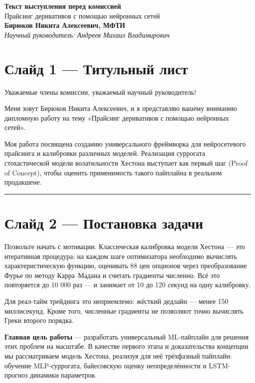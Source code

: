 \documentclass[12pt,a4paper]{article}
\begin{document}
\begin{center}
    \LARGE\textbf{Текст выступления перед комиссией}\\[1em]
    \Large Прайсинг деривативов с помощью нейронных сетей\\[1em]
    \large \textbf{Бирюков Никита Алексеевич, МФТИ}\\
    \textit{Научный руководитель: Андреев Михаил Владимирович}
\end{center}

\vspace{1.5em}

\section*{Слайд 1 — Титульный лист}

Уважаемые члены комиссии, уважаемый научный руководитель!

Меня зовут Бирюков Никита Алексеевич, и я представляю вашему вниманию дипломную работу на тему «Прайсинг деривативов с помощью нейронных сетей».

Моя работа посвящена созданию универсального фреймворка для нейросетевого прайсинга и калибровки различных моделей. Реализация суррогата стохастической модели волатильности Хестона выступает как первый шаг (Proof of Concept), чтобы оценить применимость такого пайплайна в реальном продакшене.

\vspace{1em}\hrule\vspace{1em}

\section*{Слайд 2 — Постановка задачи}

Позвольте начать с мотивации. Классическая калибровка модели Хестона — это итеративная процедура: на каждом шаге оптимизатора необходимо вычислять характеристическую функцию, оценивать 88 цен опционов через преобразование Фурье по методу Карра–Мадана и считать градиенты численно. Всё это повторяется до 10 000 раз — и занимает от 10 до 120 секунд на одну калибровку.

Для реал-тайм трейдинга это неприемлемо: жёсткий дедлайн — менее 150 миллисекунд. Кроме того, численные градиенты не позволяют точно вычислять Греки второго порядка.

\textbf{Главная цель работы} — разработать универсальный ML-пайплайн для решения этих проблем на масштабе. В качестве первого этапа и доказательства концепции мы рассматриваем модель Хестона, реализуя для неё трёхфазный пайплайн: обучение MLP-суррогата, байесовскую оценку неопределённости и LSTM-прогноз динамики параметров.
\end{document}
